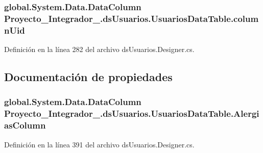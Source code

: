 \hypertarget{class_proyecto___integrador__3_1_1ds_usuarios_1_1_usuarios_data_table_aff1b3e43ca01857d574946308f13c6f5}{
\subsubsection[{column\-Uid}]{\setlength{\rightskip}{0pt plus 5cm}global.\-System.\-Data.\-Data\-Column Proyecto\-\_\-\-Integrador\-\_.\-ds\-Usuarios.\-Usuarios\-Data\-Table.\-column\-Uid\hspace{0.3cm}{\ttfamily [private]}}}\label{class_proyecto___integrador__3_1_1ds_usuarios_1_1_usuarios_data_table_aff1b3e43ca01857d574946308f13c6f5}


Definición en la línea 282 del archivo ds\-Usuarios.\-Designer.\-cs.



\subsection{Documentación de propiedades}
\hypertarget{class_proyecto___integrador__3_1_1ds_usuarios_1_1_usuarios_data_table_ae6535f8c6396d4fc1073655a15c1207d}{
\subsubsection[{Alergias\-Column}]{\setlength{\rightskip}{0pt plus 5cm}global.\-System.\-Data.\-Data\-Column Proyecto\-\_\-\-Integrador\-\_.\-ds\-Usuarios.\-Usuarios\-Data\-Table.\-Alergias\-Column\hspace{0.3cm}{\ttfamily [get]}}}\label{class_proyecto___integrador__3_1_1ds_usuarios_1_1_usuarios_data_table_ae6535f8c6396d4fc1073655a15c1207d}


Definición en la línea 391 del archivo ds\-Usuarios.\-Designer.\-cs.

